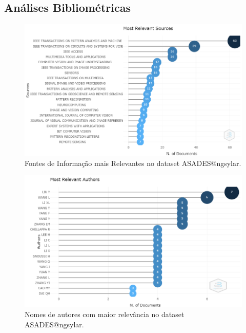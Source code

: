 \subsection{Análises Bibliométricas}

\begin{figure}[H]
    \centering
    \includegraphics[angle=0,width=1\textwidth]{experiments/ngsylar/PesqBibliogr/Imagens/ASADES-MostRelevantSources.png}
    \caption{Fontes de Informação mais Relevantes no dataset ASADES@ngsylar.}
    \label{fig:ASADES@ngsylar:RelevantSources}
\end{figure}

\begin{figure}[H]
    \centering
    \includegraphics[angle=0,width=1\textwidth]{experiments/ngsylar/PesqBibliogr/Imagens/ASADES-MostRelevantAuthors.png}
    \caption{Nomes de autores com maior relevância no dataset ASADES@ngsylar.}
    \label{fig:ASADES@ngsylar:RelevantAuthors}
\end{figure}

